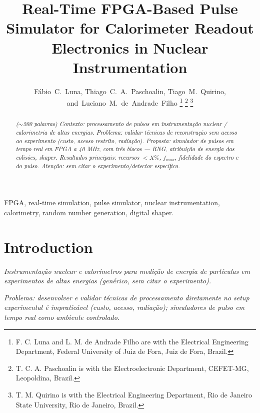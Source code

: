 \documentclass[journal]{IEEEtran}
\newcommand{\todo}[1]{\textcolor{red!70!black}{\textit{#1}}}
\begin{document}
\title{Real-Time FPGA-Based Pulse Simulator for Calorimeter Readout Electronics in Nuclear Instrumentation}

\author{Fábio~C.~Luna,
        Thiago~C.~A.~Paschoalin,
        Tiago~M.~Quirino,
        and~Luciano~M.~de~Andrade~Filho
\thanks{F. C. Luna and L. M. de Andrade Filho are with the Electrical Engineering Department, Federal University of Juiz de Fora, Juiz de Fora, Brazil.}%
\thanks{T. C. A. Paschoalin is with the Electroelectronic Department, CEFET-MG, Leopoldina, Brazil.}%
\thanks{T. M. Quirino is with the Electrical Engineering Department, Rio de Janeiro State University, Rio de Janeiro, Brazil.}}

\maketitle

\begin{abstract}
\todo{($\sim$200 palavras) Contexto: processamento de pulsos em instrumentação nuclear / calorimetria de altas energias. Problema: validar técnicas de reconstrução sem acesso ao experimento (custo, acesso restrito, radiação). Proposta: simulador de pulsos em tempo real em FPGA a 40 MHz, com três blocos — RNG, atribuição de energia das colisões, shaper. Resultados principais: recursos $< X\%$, $f_{max}$, fidelidade do espectro e do pulso. Atenção: sem citar o experimento/detector específico.}
\end{abstract}

\begin{IEEEkeywords}
FPGA, real-time simulation, pulse simulator, nuclear instrumentation, calorimetry, random number generation, digital shaper.
\end{IEEEkeywords}

\section{Introduction}

\todo{Instrumentação nuclear e calorímetros para medição de energia de partículas em experimentos de altas energias (genérico, sem citar o experimento).}

\todo{Problema: desenvolver e validar técnicas de processamento diretamente no setup experimental é impraticável (custo, acesso, radiação); simuladores de pulso em tempo real como ambiente controlado.}
\end{document}
